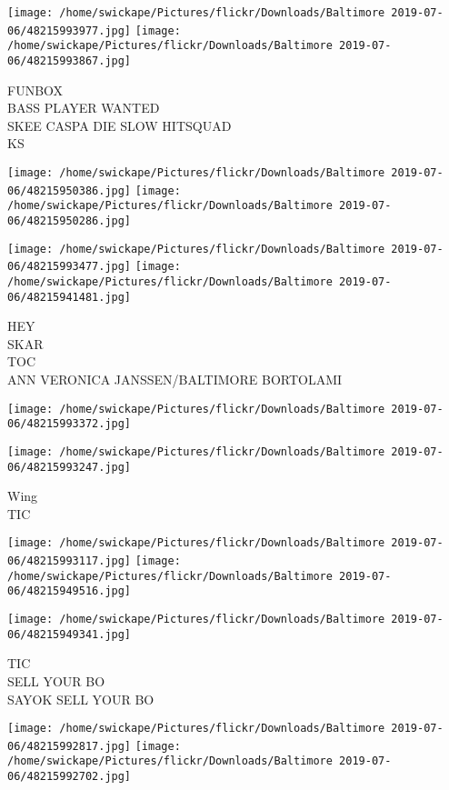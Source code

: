 \documentclass[10pt,letterpaper]{article}
\begin{document}
\texttt{[image: /home/swickape/Pictures/flickr/Downloads/Baltimore 2019-07-06/48215993977.jpg]}
\texttt{[image: /home/swickape/Pictures/flickr/Downloads/Baltimore 2019-07-06/48215993867.jpg]}

FUNBOX\\
BASS PLAYER WANTED\\
SKEE CASPA DIE SLOW HITSQUAD\\
KS
\pagebreak

\texttt{[image: /home/swickape/Pictures/flickr/Downloads/Baltimore 2019-07-06/48215950386.jpg]}
\texttt{[image: /home/swickape/Pictures/flickr/Downloads/Baltimore 2019-07-06/48215950286.jpg]}

\texttt{[image: /home/swickape/Pictures/flickr/Downloads/Baltimore 2019-07-06/48215993477.jpg]}
\texttt{[image: /home/swickape/Pictures/flickr/Downloads/Baltimore 2019-07-06/48215941481.jpg]}

HEY\\
SKAR\\
TOC\\
ANN VERONICA JANSSEN/BALTIMORE BORTOLAMI
\pagebreak

\texttt{[image: /home/swickape/Pictures/flickr/Downloads/Baltimore 2019-07-06/48215993372.jpg]}

\vspace{0.25in}
\texttt{[image: /home/swickape/Pictures/flickr/Downloads/Baltimore 2019-07-06/48215993247.jpg]}

Wing\\
TIC
\pagebreak

\texttt{[image: /home/swickape/Pictures/flickr/Downloads/Baltimore 2019-07-06/48215993117.jpg]}
\texttt{[image: /home/swickape/Pictures/flickr/Downloads/Baltimore 2019-07-06/48215949516.jpg]}

\vspace{0.25in}
\texttt{[image: /home/swickape/Pictures/flickr/Downloads/Baltimore 2019-07-06/48215949341.jpg]}

TIC\\
SELL YOUR BO\\
SAYOK SELL YOUR BO
\pagebreak

\texttt{[image: /home/swickape/Pictures/flickr/Downloads/Baltimore 2019-07-06/48215992817.jpg]}
\texttt{[image: /home/swickape/Pictures/flickr/Downloads/Baltimore 2019-07-06/48215992702.jpg]}
\end{document}
